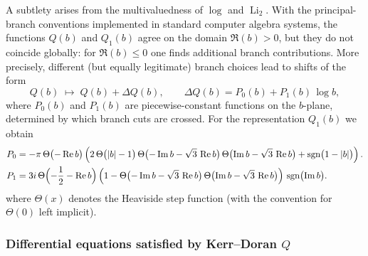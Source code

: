 \documentclass[11pt, a4paper]{article}
\newcommand{\Li}{\operatorname{Li}}
\newcommand{\sgn}{\operatorname{sgn}}
\numberwithin{equation}{section}
\begin{document}
A subtlety arises from the multivaluedness of \(\log\) and \(\Li_{2}\). With the principal-branch conventions implemented in standard computer algebra systems, the functions \(Q(b)\) and \(Q_{1}(b)\) agree on the domain \(\Re(b)>0\), but they do not coincide globally: for \(\Re(b)\le 0\) one finds additional branch contributions. More precisely, different (but equally legitimate) branch choices lead to shifts of the form
\[
Q(b)\;\longmapsto\;Q(b)+\Delta Q(b),\qquad 
\Delta Q(b)=P_{0}(b)+P_{1}(b)\,\log b,
\]
where \(P_{0}(b)\) and \(P_{1}(b)\) are piecewise-constant functions on the \(b\)-plane, determined by which branch cuts are crossed. For the representation \(Q_{1}(b)\) we obtain
\begin{equation}
  \begin{aligned}
    P_0 &= -\pi\,\Theta\bigl(-\Re b\bigr)\left(
      2\,\Theta\bigl(|b|-1\bigr)\,
      \Theta\bigl(-\Im b-\sqrt{3}\,\Re b\bigr)\,
      \Theta\bigl(\Im b-\sqrt{3}\,\Re b\bigr)
      +\sgn\bigl(1-|b|\bigr)
      \right). \\
    P_1 &= 3i\,\Theta\Bigl(-\frac{1}{2}-\Re b\Bigr)\,
      \Bigl(1-\Theta\bigl(-\Im b-\sqrt{3}\,\Re b\bigr)\,
      \Theta\bigl(\Im b-\sqrt{3}\,\Re b\bigr)\Bigr)\,
      \sgn\bigl(\Im b\bigr).
  \end{aligned}
\end{equation}
where \(\Theta(x)\) denotes the Heaviside step function (with the convention for \(\Theta(0)\) left implicit).



\subsubsection{Differential equations satisfied by Kerr--Doran \texorpdfstring{$Q$}{Q}}
\end{document}
